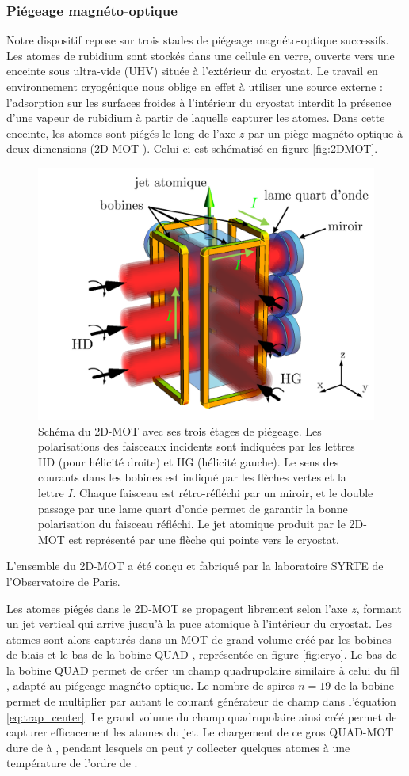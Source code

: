 	\subsubsection*{Piégeage magnéto-optique}
\noindent	Notre dispositif repose sur trois stades de piégeage magnéto-optique successifs.
Les atomes de rubidium sont stockés dans une cellule en verre, ouverte vers une enceinte sous ultra-vide (UHV) située à l'extérieur du cryostat.
Le travail en environnement cryogénique nous oblige en effet à utiliser une source externe : l'adsorption sur les surfaces froides à l'intérieur du cryostat interdit la présence d'une vapeur de rubidium à partir de laquelle capturer les atomes.
Dans cette enceinte, les atomes sont piégés le long de l'axe $z$ par un piège magnéto-optique à deux dimensions (\og 2D-MOT \fg{}).
Celui-ci est schématisé en figure \eqref{fig:2DMOT}.
%	
\begin{figure}[!h]
\centering
\includegraphics[width=0.6\linewidth]{figures/setup/coldatoms/2DMOT}
\caption[Schéma du 2D-MOT]{Schéma du 2D-MOT avec ses trois étages de piégeage.
Les polarisations des faisceaux incidents sont indiquées par les lettres HD (pour hélicité droite) et HG (hélicité gauche).%
Le sens des courants dans les bobines est indiqué par les flèches vertes et la lettre $I$.
Chaque faisceau est rétro-réfléchi par un miroir, et le double passage par une lame quart d'onde permet de garantir la bonne polarisation du faisceau réfléchi.
Le jet atomique produit par le 2D-MOT est représenté par une flèche qui pointe vers le cryostat.
}
\label{fig:2DMOT}
\end{figure}
%
L'ensemble du 2D-MOT a été conçu et fabriqué par la laboratoire SYRTE de l'Observatoire de Paris.

Les atomes piégés dans le 2D-MOT se propagent librement selon l'axe $z$, formant un jet vertical qui arrive jusqu'à la puce atomique à l'intérieur du cryostat.
Les atomes sont alors capturés dans un MOT de grand volume créé par les bobines de biais et le bas de la bobine \og QUAD \fg{}, représentée en figure \eqref{fig:cryo}.
Le bas de la bobine QUAD permet de créer un champ quadrupolaire similaire à celui du fil , adapté au piégeage magnéto-optique.
Le nombre de spires $n=19$ de la bobine permet de multiplier par autant le courant générateur de champ dans l'équation \eqref{eq:trap_center}.
Le grand volume du champ quadrupolaire ainsi créé permet de capturer efficacement les atomes du jet.
Le chargement de ce gros \og QUAD-MOT \fg{} dure de  à , pendant lesquels on peut y collecter quelques  atomes à une température de l'ordre de .

